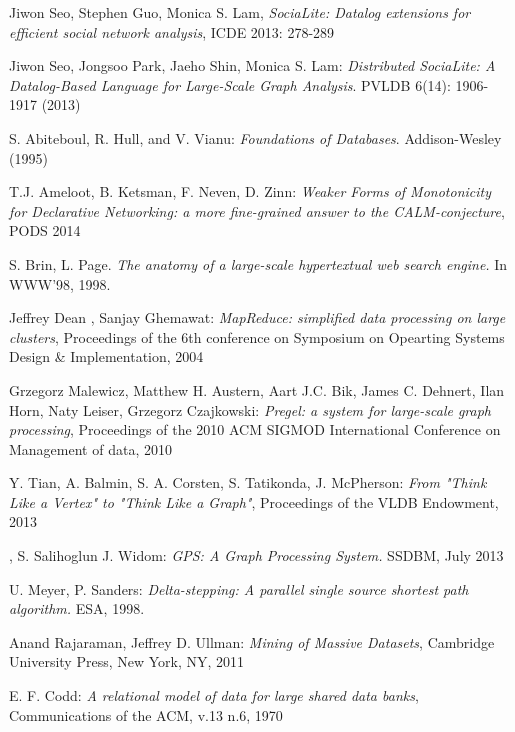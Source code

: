 
\begin{thebibliography}{99}


 Jiwon Seo, Stephen Guo, Monica S. Lam, \textit{SociaLite: Datalog extensions for efficient social network analysis}, ICDE 2013: 278-289

 Jiwon Seo, Jongsoo Park, Jaeho Shin, Monica S. Lam: \textit{Distributed SociaLite: A Datalog-Based Language for Large-Scale Graph Analysis}. PVLDB 6(14): 1906-1917 (2013)

 S. Abiteboul, R. Hull, and V. Vianu: \textit{Foundations of Databases}. Addison-Wesley (1995)

 T.J. Ameloot, B. Ketsman, F. Neven, D. Zinn: \textit{Weaker Forms of Monotonicity for Declarative Networking: a more fine-grained answer to the CALM-conjecture}, PODS 2014

 S. Brin, L. Page. \textit{The anatomy of a large-scale hypertextual web search engine.} In WWW’98, 1998.

 Jeffrey Dean , Sanjay Ghemawat: \textit{MapReduce: simplified data processing on large clusters}, Proceedings of the 6th conference on Symposium on Opearting Systems Design \& Implementation, 2004

 Grzegorz Malewicz, Matthew H. Austern, Aart J.C. Bik, James C. Dehnert, Ilan Horn, Naty Leiser, Grzegorz Czajkowski: \textit{Pregel: a system for large-scale graph processing}, Proceedings of the 2010 ACM SIGMOD International Conference on Management of data, 2010

 Y. Tian, A. Balmin, S. A. Corsten, S. Tatikonda, J. McPherson: \textit{From "Think Like a Vertex" to "Think Like a Graph"}, Proceedings of the VLDB Endowment, 2013

, S. Salihoglun J. Widom: \textit{GPS: A Graph Processing System.} SSDBM, July 2013

 U. Meyer, P. Sanders: \textit{Delta-stepping: A parallel single source shortest path algorithm.} ESA, 1998.

 Anand Rajaraman, Jeffrey D. Ullman: \textit{Mining of Massive Datasets}, Cambridge University Press, New York, NY, 2011

 E. F. Codd: \textit{A relational model of data for large shared data banks}, Communications of the ACM, v.13 n.6, 1970


\end{thebibliography}
